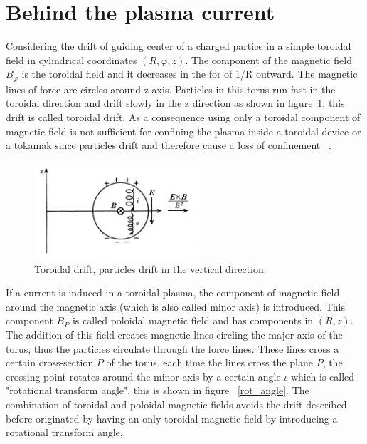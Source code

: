 \section{Behind the plasma current}

Considering the drift of guiding center of a charged partice in a simple toroidal field in cylindrical coordinates $(R,\varphi,z)$. The component of the magnetic field $B_\varphi$ is the toroidal field and it decreases in the for of 1/R outward. The magnetic lines of force are circles around z axis. Particles in this  torus run fast in the toroidal direction and drift slowly in the z direction as shown in figure~\ref{TDrift}, this drift is called toroidal drift. As a consequence  using only a toroidal component of magnetic field is not sufficient for confining the plasma inside a toroidal device or a tokamak  since particles drift and therefore cause a loss of confinement ~\cite[Chapter~3]{Miyamoto2011}.\smallskip


\begin{figure}
	\centering
	\includegraphics[width=0.55\textwidth]{Chp1/ToroidalDrift.png}
	\caption{Toroidal drift, particles drift in the vertical direction. ~\cite[Chapter~3]{Miyamoto2011} \label{TDrift}}
\end{figure}



If a current is induced in a toroidal plasma, the component of magnetic field around the magnetic axis (which is also called minor axis) is introduced. This component $B_P$ is called poloidal magnetic field and has components in $(R,z)$. The addition of this field creates magnetic lines circling the major axis of the torus, thus the particles circulate through the force lines. These lines cross a certain cross-section $P$ of the torus, each time the lines cross the plane $P$, the crossing point rotates around the minor axis by a certain angle $\iota$ which is called "rotational transform angle", this is shown in figure ~\ref{rot_angle}. The combination of toroidal and poloidal magnetic fields avoids the drift  described before originated by having an only-toroidal magnetic field by introducing a rotational transform angle.  \smallskip


